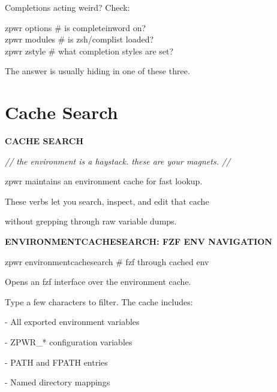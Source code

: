 \documentclass[11pt,a4paper,twoside]{book}
\begin{document}
Completions acting weird? Check:

\begin{codebox}
zpwr options    \# is completeinword on?\\
zpwr modules    \# is zsh/complist loaded?\\
zpwr zstyle     \# what completion styles are set?\\
\end{codebox}

The answer is usually hiding in one of these three.


\vspace{16pt}

\section{Cache Search}


\vspace{10pt}
{\large\bfseries\color{neoncyan} CACHE SEARCH}\vspace{6pt}

{\small\itshape\color{dimtext} // the environment is a haystack. these are your magnets. //}

\begin{codebox}
zpwr maintains an environment cache for fast lookup.\\
\end{codebox}

These verbs let you search, inspect, and edit that cache

without grepping through raw variable dumps.


\vspace{12pt}
{\bfseries\color{neonyellow} ENVIRONMENTCACHESEARCH: FZF ENV NAVIGATION}\vspace{4pt}

\begin{codebox}
zpwr environmentcachesearch         \# fzf through cached env\\
\end{codebox}

Opens an fzf interface over the environment cache.

Type a few characters to filter. The cache includes:

- All exported environment variables

- ZPWR\_* configuration variables

- PATH and FPATH entries

- Named directory mappings
\end{document}
